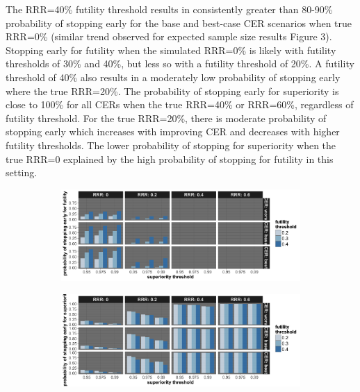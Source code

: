 \documentclass[]{article}
\begin{document}
The RRR=40\% futility threshold results in consistently greater than
80-90\% probability of stopping early for the base and best-case CER
scenarios when true RRR=0\% (similar trend observed for expected sample
size results Figure 3). Stopping early for futility when the simulated
RRR=0\% is likely with futility thresholds of 30\% and 40\%, but less so
with a futility threshold of 20\%. A futility threshold of 40\% also
results in a moderately low probability of stopping early where the true
RRR=20\%. The probability of stopping early for superiority is close to
100\% for all CERs when the true RRR=40\% or RRR=60\%, regardless of
futility threshold. For the true RRR=20\%, there is moderate probability
of stopping early which increases with improving CER and decreases with
higher futility thresholds. The lower probability of stopping for
superiority when the true RRR=0 explained by the high probability of
stopping for futility in this setting.

\begin{figure}
\centering
  \caption{Probability of stopping early due to futility, and stopping early due to superiority. Stopping probabilities
  are presented for the three control event rates (CER – rows), four relative risk reductions (RRR – columns), three
  superiority thresholds (x axis) and three futility thresholds (legend).}
  \label{fig:fig}
  \begin{subfigure}{0.8\textwidth}
    \centering
    \caption{}
    \includegraphics{../plots/stop_p1_new/early_fut_sim_05_stopp1_new.png}
  \end{subfigure}
  \begin{subfigure}{0.8\textwidth}
    \centering
    \caption{}
    \includegraphics{../plots/stop_p1_new/early_sup_sim_05_stopp1_new.png}
  \end{subfigure}
\end{figure}
\end{document}
